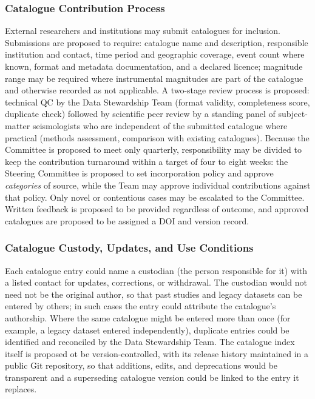\documentclass[11pt]{article}
\begin{document}
\subsubsection{Catalogue Contribution Process}
\label{sec:contribution}
External researchers and institutions may submit catalogues for inclusion. Submissions are proposed to require: catalogue name and description, responsible institution and contact, time period and geographic coverage, event count where known, format and metadata documentation, and a declared licence; magnitude range may be required where instrumental magnitudes are part of the catalogue and otherwise recorded as not applicable. A two-stage review process is proposed: technical QC by the Data Stewardship Team (format validity, completeness score, duplicate check) followed by scientific peer review by a standing panel of subject-matter seismologists who are independent of the submitted catalogue where practical (methods assessment, comparison with existing catalogues). Because the Committee is proposed to meet only quarterly, responsibility may be divided to keep the contribution turnaround within a target of four to eight weeks: the Steering Committee is proposed to set incorporation policy and approve \emph{categories} of source, while the Team may approve individual contributions against that policy. Only novel or contentious cases may be escalated to the Committee. Written feedback is proposed to be provided regardless of outcome, and approved catalogues are proposed to be assigned a DOI and version record.

\subsubsection{Catalogue Custody, Updates, and Use Conditions}
Each catalogue entry could name a custodian (the person responsible for it) with a listed contact for updates, corrections, or withdrawal. The custodian would not need not be the original author, so that past studies and legacy datasets can be entered by others; in such cases the entry could attribute the catalogue's authorship. Where the same catalogue might be entered more than once (for example, a legacy dataset entered independently), duplicate entries could be identified and reconciled by the Data Stewardship Team. The catalogue index itself is proposed ot be version-controlled, with its release history maintained in a public Git repository, so that additions, edits, and deprecations would be transparent and a superseding catalogue version could be linked to the entry it replaces.
\end{document}
